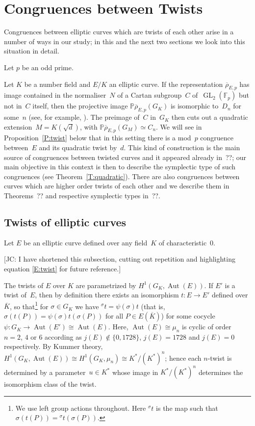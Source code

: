 \documentclass[12pt, reqno]{amsart}
\newcommand{\F}{\mathbb{F}}
\newcommand{\PP}{\mathbb{P}}
\newcommand{\Kbar}{{\overline{K}}}
\newcommand{\rhobar}{{\overline{\rho}}}
\DeclareMathOperator{\Aut}{Aut}
\newcommand{\GL}{\operatorname{GL}}
\numberwithin{equation}{section}
\theoremstyle{definition}
\theoremstyle{remark}
\newcommand{\jc}[1]{{\color{darkgreen} \textsf{[JC: #1]}}}
\begin{document}
\section{Congruences between Twists}\label{S:cong-twist}

Congruences between elliptic curves which are twists of each other
arise in a number of ways in our study; in this and the next two
sections we look into this situation in detail.

Let $p$ be an odd prime.

Let $K$ be a number field and $E/K$ an elliptic curve. If the
representation $\rhobar_{E,p}$ has image contained in the
normaliser~$N$ of a Cartan subgroup~$C$ of~$\GL_2(\F_p)$ but not
in~$C$ itself, then the projective image $\PP \rhobar_{E,p}(G_K)$ is
isomorphic to~$D_{n}$ for some~$n$ (see, for example, \cite[Theorem
  XI.2.3]{LangModForms}).  The preimage of~$C$ in~$G_K$ then cuts out
a quadratic extension~$M = K(\sqrt{d})$, with $\PP \rhobar_{E,p}(G_M)
\simeq C_n$.  We will see in Proposition~\ref{P:twist} below that in
this setting there is a mod~$p$ congruence between~$E$ and its
quadratic twist by~$d$.  This kind of construction is the main source
of congruences between twisted curves and it appeared already in~??;
our main objective in this context is then to describe the symplectic
type of such congruences (see Theorem~\ref{T:quadratic}). There are
also congruences between curves which are higher order twists of each
other and we describe them in Theorems~?? and respective symplectic
types in~??.

\subsection{Twists of elliptic curves}

Let $E$ be an elliptic curve defined over any field~$K$ of
characteristic~$0$.

\jc{I have shortened this subsection, cutting out repetition and
  highlighting equation \eqref{E:twist} for future reference.}

The twists of $E$ over $K$ are parametrized by $H^1(G_K,\Aut(E))$.  If
$E'$ is a twist of~$E$, then by definition there exists an isomorphism
$t:E\to E'$ defined over $\Kbar$, so that\footnote{We use left group
  actions throughout.  Here ${}^{\sigma}t$ is the map such that
  $\sigma(t(P))={}^{\sigma}t(\sigma(P))$.}  for $\sigma\in G_K$ we
have ${}^{\sigma}t=\psi(\sigma)t$ (that is,
$\sigma(t(P))=\psi(\sigma)t(\sigma(P))$ for all $P\in E(\Kbar)$) for
some cocycle~$\psi:G_K\to\Aut(E')\cong\Aut(E)$.  Here,
$\Aut(E)\cong\mu_n$ is cyclic of order~$n=2$, $4$ or $6$ according as
$j(E)\not\in\{0,1728\}$, $j(E)=1728$ and $j(E)=0$ respectively.  By
Kummer theory, $H^1(G_K,\Aut(E))\cong H^1(G_K,\mu_n)\cong
K^*/(K^*)^n$; hence each $n$-twist is determined by a parameter~$u\in
K^*$ whose image in $K^*/(K^*)^n$ determines the isomorphism class of
the twist.
\end{document}
